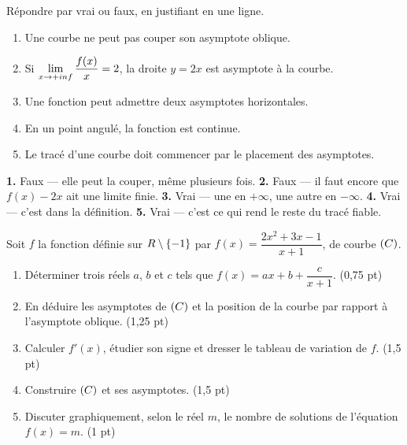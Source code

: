 \begin{jemeteste}
Répondre par vrai ou faux, en justifiant en une ligne.

\begin{enumerate}[label=\textbf{\arabic*.}, leftmargin=*, itemsep=0.28em]
  \item Une courbe ne peut pas couper son asymptote oblique.
  \item Si $\limpinf \dfrac{f(x)}{x} = 2$, la droite $y = 2x$ est asymptote à
        la courbe.
  \item Une fonction peut admettre deux asymptotes horizontales.
  \item En un point angulé, la fonction est continue.
  \item Le tracé d'une courbe doit commencer par le placement des asymptotes.
\end{enumerate}
\end{jemeteste}

\begin{corrige}[je me teste]
\textbf{1.} Faux — elle peut la couper, même plusieurs fois.
\textbf{2.} Faux — il faut encore que $f(x)-2x$ ait une limite finie.
\textbf{3.} Vrai — une en $+\infty$, une autre en $-\infty$.
\textbf{4.} Vrai — c'est dans la définition.
\textbf{5.} Vrai — c'est ce qui rend le reste du tracé fiable.
\end{corrige}

\begin{commeaubac}
Soit $f$ la fonction définie sur $R \setminus \{-1\}$ par
$f(x) = \dfrac{2x^{2}+3x-1}{x+1}$, de courbe $(C)$.

\begin{enumerate}[label=\textbf{\arabic*.}, leftmargin=*, itemsep=0.25em]
  \item Déterminer trois réels $a$, $b$ et $c$ tels que
        $f(x) = ax+b+\dfrac{c}{x+1}$. \hfill\textup{(0,75 pt)}
  \item En déduire les asymptotes de $(C)$ et la position de la courbe par
        rapport à l'asymptote oblique. \hfill\textup{(1,25 pt)}
  \item Calculer $f'(x)$, étudier son signe et dresser le tableau de variation
        de $f$. \hfill\textup{(1,5 pt)}
  \item Construire $(C)$ et ses asymptotes. \hfill\textup{(1,5 pt)}
  \item Discuter graphiquement, selon le réel $m$, le nombre de solutions de
        l'équation $f(x) = m$. \hfill\textup{(1 pt)}
\end{enumerate}
\end{commeaubac}


